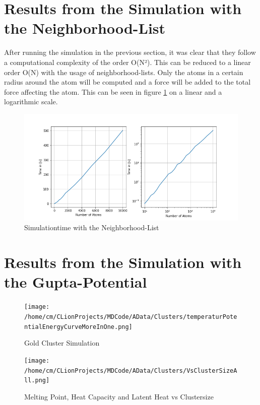 \section{Results from the Simulation with the Neighborhood-List}

After running the simulation in the previous section, it was clear that they follow a computational complexity of the order O(N²). This can be reduced to a linear order O(N) with the usage of neighborhood-lists. Only the atoms in a certain radius around the atom will be computed and a force will be added to the total force affecting the atom. This can be seen in figure \ref{PlotSimulationTimesCutoffNew} on a linear and a logarithmic scale.  
\begin{figure}
	\begin{center}
		\includegraphics[scale=1.25]{Figure/plotAtomTimesMoreData.png}
	\end{center}
	\caption[Simulationtime with the Neighborhood-List]{Simulationtime with the Neighborhood-List}
	\label{PlotSimulationTimesCutoffNew}
\end{figure}

\section{Results from the Simulation with the Gupta-Potential}

\begin{figure}
	\begin{center} 
		\texttt{[image: /home/cm/CLionProjects/MDCode/AData/Clusters/temperaturPotentialEnergyCurveMoreInOne.png]} 
	\end{center} 
	\caption[Gold Cluster Simulation]{Gold Cluster Simulation} 
	\label{GoldClusterSimulationTemperaturEnergy4In1} 
\end{figure} 

\begin{figure}[!h] 
	\begin{center} 
		\texttt{[image: /home/cm/CLionProjects/MDCode/AData/Clusters/VsClusterSizeAll.png]} 
	\end{center} 
	\caption[Melting Point, Heat Capacity and Latent Heat vs Clustersize]{Melting Point, Heat Capacity and Latent Heat vs Clustersize} 
	\label{GoldClusterSimulationVsClustersize} 
\end{figure} 
